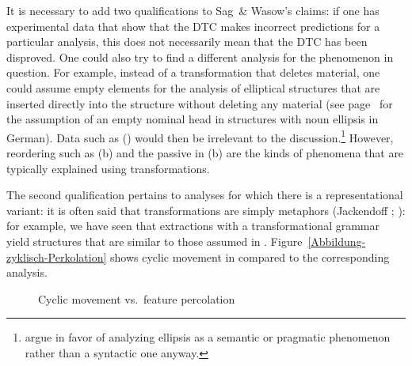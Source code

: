 It is necessary to add two qualifications to Sag~\& Wasow's claims: if one has experimental data that show that the DTC makes incorrect predictions for a particular
analysis, this does not necessarily mean that the DTC has been disproved. One could also try to find a different analysis for the phenomenon in question.
For example, instead of a transformation that deletes material, one could assume empty elements for the analysis of elliptical structures that are inserted
directly into the structure without deleting any material (see page~\pageref{np-epsilon} for the
assumption of an empty nominal head in structures with noun ellipsis in German). Data such as () would then be irrelevant to the discussion.\footnote{%
  \citet[Chapters~1 and~7]{CJ2005a} argue in favor of analyzing ellipsis as a semantic or pragmatic phenomenon rather than a syntactic
  one anyway.
} 
However, reordering such as (b) and the passive in (b) are the kinds of phenomena that are typically explained using transformations.

\largerpage
The second qualification pertains to analyses for which there is a representational variant: it is often said that transformations are simply
metaphors (Jackendoff \citeyear[--23]{Jackendoff2000a}; \citeyear[, 20]{Jackendoff2007a}): for example, we have seen that extractions with a transformational grammar yield structures that
are similar to those assumed in \hpsg. Figure~\vref{Abbildung-zyklisch-Perkolation} shows cyclic movement in \gbt compared
to the corresponding \hpsg analysis.
\begin{figure}
\hfill%
\hfill
{}
\hfill\mbox{}%
\caption{Cyclic movement vs.\ feature percolation}\label{Abbildung-zyklisch-Perkolation}
\end{figure}%

